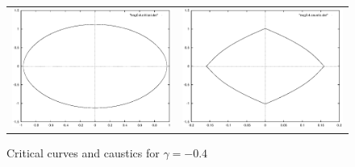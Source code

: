 \documentclass[a4paper]{IEEEtran}
\begin{document}
    \begin{figure}
        \caption{Critical curves and caustics for $\gamma = -0.4$}
        \label{fig:critical-gamma-0-4}   
        \begin{center}
            \begin{tabular}{cc} 
                \includegraphics[width=\columnwidth]{images/neg0-4-critical.eps} &
                \includegraphics[width=\columnwidth]{images/neg0-4-caustic.eps} 
            \end{tabular} 
        \end{center}
    \end{figure} 
\end{document}
